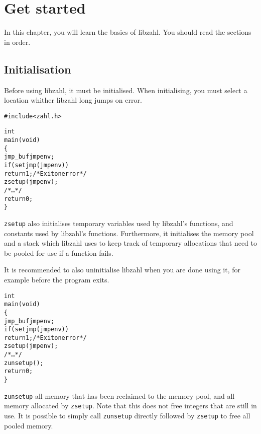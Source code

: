 \chapter{Get started}
\label{chap:Get started}

In this chapter, you will learn the basics of libzahl.
You should read the sections in order.

\vspace{1cm}
\minitoc




\newpage
\section{Initialisation}
\label{sec:Initialisation}

Before using libzahl, it must be initialised. When
initialising, you must select a location whither libzahl
long jumps on error.

\begin{alltt}
   #include <zahl.h>

   int
   main(void)
   \{
       jmp_buf jmpenv;
       if (setjmp(jmpenv))
           return 1; \textcolor{c}{/* \textrm{Exit on error} */}
       zsetup(jmpenv);
       \textcolor{c}{/* \textrm{\ldots} */}
       return 0;
   \}
\end{alltt}

{\tt zsetup} also initialises temporary variables used
by libzahl's functions, and constants used by libzahl's
functions. Furthermore, it initialises the memory pool
and a stack which libzahl uses to keep track of temporary
allocations that need to be pooled for use if a function
fails.

It is recommended to also uninitialise libzahl when you
are done using it, for example before the program exits.

\begin{alltt}
   \textcolor{c}{int
   main(void)
   \{
       jmp_buf jmpenv;
       if (setjmp(jmpenv))
           return 1; /* \textrm{Exit on error} */
       zsetup(jmpenv);
       /* \textrm{\ldots} */}
       zunsetup();
       \textcolor{c}{return 0;
   \}}
\end{alltt}

{\tt zunsetup} all memory that has been reclaimed to
the memory pool, and all memory allocated by {\tt zsetup}.
Note that this does not free integers that are still
in use. It is possible to simply call {\tt zunsetup}
directly followed by {\tt zsetup} to free all pooled
memory.


